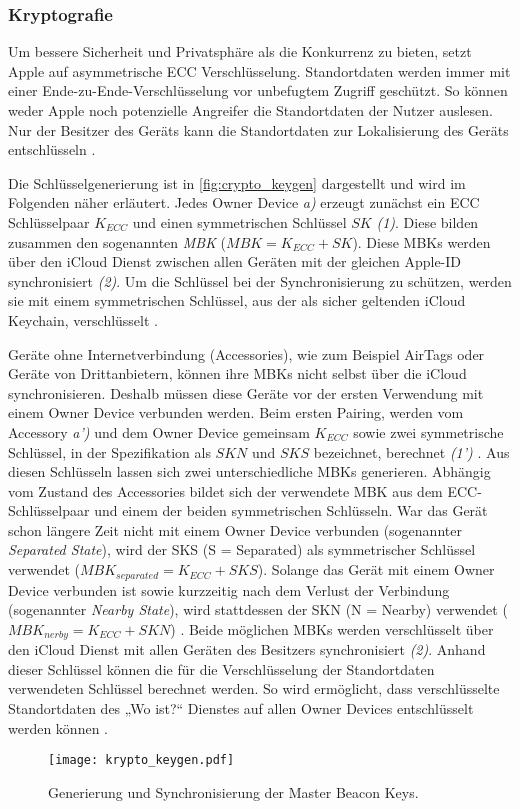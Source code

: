\subsubsection{Kryptografie}
\label{sec:Kryptografie}

Um bessere Sicherheit und Privatsphäre als die Konkurrenz zu bieten, setzt Apple auf asymmetrische \ac{ECC} Verschlüsselung.
Standortdaten werden immer mit einer Ende-zu-Ende-Verschlüsselung vor unbefugtem Zugriff geschützt.
So können weder Apple noch potenzielle Angreifer die Standortdaten der Nutzer auslesen.
Nur der Besitzer des Geräts kann die Standortdaten zur Lokalisierung des Geräts entschlüsseln \cite{Greenberg_FindMyCrypto}.

Die Schlüsselgenerierung ist in \autoref{fig:crypto_keygen} dargestellt und wird im Folgenden näher erläutert.
Jedes Owner Device \textit{a)} erzeugt zunächst ein \ac{ECC} Schlüsselpaar $K_{ECC}$ und einen symmetrischen Schlüssel $SK$ \textit{(1)}.
Diese bilden zusammen den sogenannten \textit{\ac{MBK}} ($MBK = K_{ECC} + SK$).
Diese \acp{MBK} werden über den iCloud Dienst zwischen allen Geräten mit der gleichen Apple-ID synchronisiert \textit{(2)}.
Um die Schlüssel bei der Synchronisierung zu schützen, werden sie mit einem symmetrischen Schlüssel, aus der als sicher geltenden iCloud Keychain, verschlüsselt \cite{Heinrich_FindMy,Afonin_iCloudKeychain}.

   
Geräte ohne Internetverbindung (Accessories), wie zum Beispiel AirTags oder Geräte von Drittanbietern, können ihre \acp{MBK} nicht selbst über die iCloud synchronisieren.
Deshalb müssen diese Geräte vor der ersten Verwendung mit einem Owner Device verbunden werden.
Beim ersten Pairing, werden vom Accessory \textit{a')} und dem Owner Device gemeinsam $K_{ECC}$ sowie zwei symmetrische Schlüssel, in der Spezifikation als $SKN$ und $SKS$ bezeichnet, berechnet \textit{(1')} \cite{Apple_FindMySpec}.
Aus diesen Schlüsseln lassen sich zwei unterschiedliche \acp{MBK} generieren.
Abhängig vom Zustand des Accessories bildet sich der verwendete \ac{MBK} aus dem \ac{ECC}-Schlüsselpaar und einem der beiden symmetrischen Schlüsseln.
War das Gerät schon längere Zeit nicht mit einem Owner Device verbunden (sogenannter \textit{Separated State}), wird der SKS (S = Separated) als symmetrischer Schlüssel verwendet ($MBK_{separated} = K_{ECC} + SKS$).
Solange das Gerät mit einem Owner Device verbunden ist sowie kurzzeitig nach dem Verlust der Verbindung (sogenannter \textit{Nearby State}), wird stattdessen der SKN (N = Nearby) verwendet ($MBK_{nerby} = K_{ECC} + SKN$) \cite{Apple_FindMySpec}.
Beide möglichen \acp{MBK} werden verschlüsselt über den iCloud Dienst mit allen Geräten des Besitzers synchronisiert \textit{(2)}.
Anhand dieser Schlüssel können die für die Verschlüsselung der Standortdaten verwendeten Schlüssel berechnet werden.
So wird ermöglicht, dass verschlüsselte Standortdaten des „Wo ist?“ Dienstes auf allen Owner Devices entschlüsselt werden können \cite{Heinrich_FindMy}.
\begin{figure}[ht]
    \centering
    \texttt{[image: krypto\_keygen.pdf]}
    \caption{Generierung und Synchronisierung der Master Beacon Keys.}
    \label{fig:crypto_keygen}
\end{figure}



